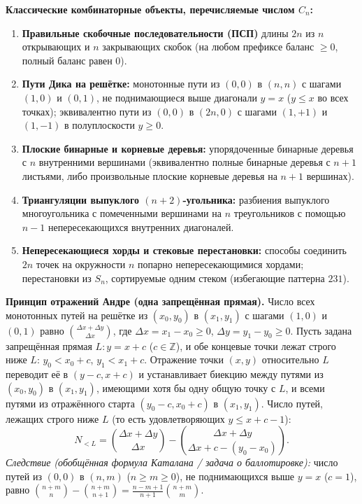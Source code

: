 \documentclass[10pt,a4paper]{article}
\renewcommand{\le}{\leqslant}
\renewcommand{\ge}{\geqslant}
\newcommand{\Z}{\mathbb{Z}}
\begin{document}
\textbf{Классические комбинаторные объекты, перечисляемые числом $C_n$:}
\begin{enumerate}
  \item \textbf{Правильные скобочные последовательности (ПСП)} длины $2n$ из $n$ открывающих и $n$ закрывающих скобок (на любом префиксе баланс $\ge 0$, полный баланс равен $0$).
  \item \textbf{Пути Дика на решётке:} монотонные пути из $(0, 0)$ в $(n, n)$ с шагами $(1, 0)$ и $(0, 1)$, не поднимающиеся выше диагонали $y = x$ ($y \le x$ во всех точках); эквивалентно пути из $(0, 0)$ в $(2n, 0)$ с шагами $(1, +1)$ и $(1, -1)$ в полуплоскости $y \ge 0$.
  \item \textbf{Плоские бинарные и корневые деревья:} упорядоченные бинарные деревья с $n$ внутренними вершинами (эквивалентно полные бинарные деревья с $n + 1$ листьями, либо произвольные плоские корневые деревья на $n + 1$ вершинах).
  \item \textbf{Триангуляции выпуклого $(n + 2)$-угольника:} разбиения выпуклого многоугольника с помеченными вершинами на $n$ треугольников с помощью $n - 1$ непересекающихся внутренних диагоналей.
  \item \textbf{Непересекающиеся хорды и стековые перестановки:} способы соединить $2n$ точек на окружности $n$ попарно непересекающимися хордами; перестановки из $S_n$, сортируемые одним стеком (избегающие паттерна $231$).
\end{enumerate}

\textbf{Принцип отражений Андре (одна запрещённая прямая).} Число всех монотонных путей на решётке из $(x_0, y_0)$ в $(x_1, y_1)$ с шагами $(1, 0)$ и $(0, 1)$ равно $\binom{\Delta x + \Delta y}{\Delta x}$, где $\Delta x = x_1 - x_0 \ge 0$, $\Delta y = y_1 - y_0 \ge 0$. Пусть задана запрещённая прямая $L : y = x + c$ ($c \in \Z$), и обе концевые точки лежат строго ниже $L$: $y_0 < x_0 + c$, $y_1 < x_1 + c$. Отражение точки $(x, y)$ относительно $L$ переводит её в $(y - c, x + c)$ и устанавливает биекцию между путями из $(x_0, y_0)$ в $(x_1, y_1)$, имеющими хотя бы одну общую точку с $L$, и всеми путями из отражённого старта $(y_0 - c, x_0 + c)$ в $(x_1, y_1)$. Число путей, лежащих строго ниже $L$ (то есть удовлетворяющих $y \le x + c - 1$):
\[
  N_{< L} = \binom{\Delta x + \Delta y}{\Delta x} - \binom{\Delta x + \Delta y}{\Delta x + c - (y_0 - x_0)}.
\]
\emph{Следствие (обобщённая формула Каталана / задача о баллотировке):} число путей из $(0, 0)$ в $(n, m)$ ($n \ge m \ge 0$), не поднимающихся выше $y = x$ ($c = 1$), равно $\binom{n + m}{n} - \binom{n + m}{n + 1} = \frac{n - m + 1}{n + 1}\binom{n + m}{m}$.
\end{document}
